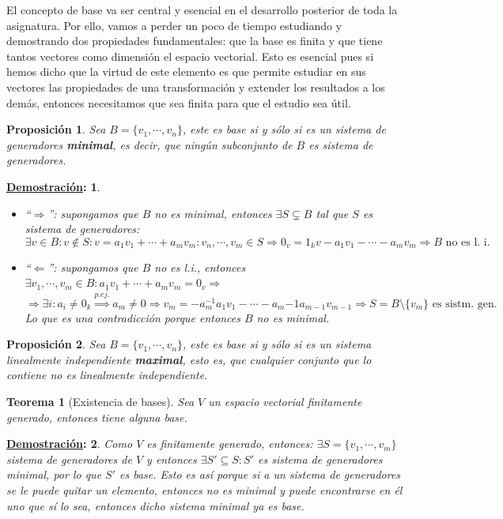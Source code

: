 \documentclass[10pt,a4paper,openright]{book}
\theoremstyle{break}
\newtheorem*{theo}{Teorema}
\newtheorem*{prop}{Proposición}
\newtheorem*{demo}{\underline{Demostración}:}
\begin{document}
El concepto de base va ser central y esencial en el desarrollo posterior de toda la asignatura. Por ello, vamos a perder un poco de tiempo estudiando y demostrando dos propiedades fundamentales: que la base es finita y que tiene tantos vectores como dimensión el espacio vectorial. Esto es esencial pues si hemos dicho que la virtud de este elemento es que permite estudiar en sus vectores las propiedades de una transformación y extender los resultados a los demás, entonces necesitamos que sea finita para que el estudio sea útil.

\begin{prop}
Sea $B = \{v_1, \cdots, v_n\}$, este es base si y sólo si es un sistema de generadores \textbf{minimal}, es decir, que ningún subconjunto de $B$ es sistema de generadores.
\end{prop}
\begin{demo}
\begin{itemize}
\item ``$\Rightarrow$'':
	supongamos que $B$ no es minimal, entonces $\exists S\subsetneq B$ tal que $S$ es sistema de generadores:
	$$\exists v\in B: v\notin S: v=a_1v_1+\cdots+a_mv_m: v_n, \cdots, v_m\in S\Rightarrow 0_v=1_kv-a_1v_1-\cdots-a_mv_m\Rightarrow B\mbox{ no es l. i.}$$
	
\item ``$\Leftarrow$'':
	supongamos que $B$ no es l.i., entonces $\exists v_1, \cdots, v_m\in B: a_1v_1+\cdots+ a_mv_m=0_v\Rightarrow$
	$$\Rightarrow \exists i: a_i\neq 0_k\stackrel{p.ej.}{\Rightarrow}a_m\neq 0\Rightarrow v_m=-a_m^{-1}a_1v_1-\cdots-a_m{-1}a_{m-1}v_{m-1}\Rightarrow S=B\mbox{\textbackslash}\{v_m\} \mbox{ es sistm. gen.}$$
	Lo que es una contradicción porque entonces $B$ no es minimal.
\end{itemize}
\end{demo}

\begin{prop}
Sea $B = \{v_1, \cdots, v_n\}$, este es base si y sólo si es un sistema linealmente independiente \textbf{maximal}, esto es, que cualquier conjunto que lo contiene no es linealmente independiente.
\end{prop}

\begin{theo}[Existencia de bases]
Sea $V$ un espacio vectorial finitamente generado, entonces tiene alguna base.
\end{theo}
\begin{demo}
Como $V$ es finitamente generado, entonces: $\exists S=\{v_1, \cdots, v_m\}$ sistema de generadores de $V$ y entonces $\exists S'\subseteq S: S'$ es sistema de generadores minimal, por lo que $S'$ es base. Esto es así porque si a un sistema de generadores se le puede quitar un elemento, entonces no es minimal y puede encontrarse en él uno que sí lo sea, entonces dicho sistema minimal ya es base.
\end{demo}
\end{document}
